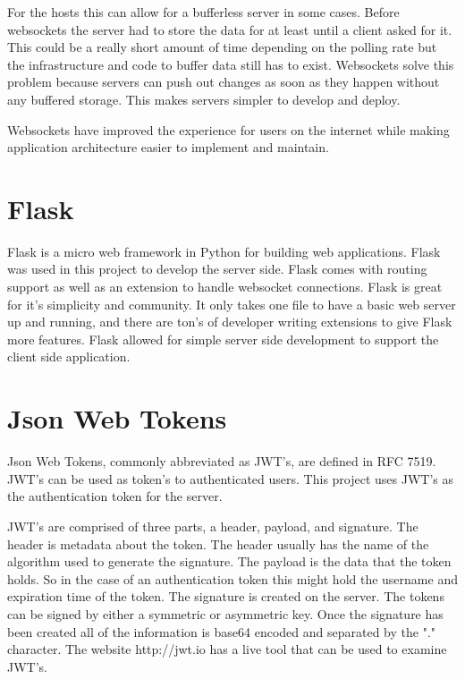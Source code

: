 For the hosts this can allow for a bufferless server in some cases. Before websockets the server had to store the data for at least until a client asked for it. This could be a really short amount of time depending on the polling rate but the infrastructure and code to buffer data still has to exist. Websockets solve this problem because servers can push out changes as soon as they happen without any buffered storage. This makes servers simpler to develop and deploy.


Websockets have improved the experience for users on the internet while making application architecture easier to implement and maintain.


\section{Flask}


Flask is a micro web framework in Python for building web applications.\cite{flask}
Flask was used in this project to develop the server side. Flask comes with routing support as well as an extension to handle websocket connections. Flask is great for it’s simplicity and community. It only takes one file to have a basic web server up and running, and there are ton’s of developer writing extensions to give Flask more features. Flask allowed for simple server side development to support the client side application.


\section{Json Web Tokens}


Json Web Tokens, commonly abbreviated as JWT’s, are defined in RFC 7519.\cite{jwt-rfc} JWT’s can be used as token’s to authenticated users. This project uses JWT’s as the authentication token for the server.


JWT’s are comprised of three parts, a header, payload, and signature. The header is metadata about the token. The header usually has the name of the algorithm used to generate the signature. The payload is the data that the token holds. So in the case of an authentication token this might hold the username and expiration time of the token. The signature is created on the server. The tokens can be signed by either a symmetric or asymmetric key. Once the signature has been created all of the information is base64 encoded and separated by the "." character. The website http://jwt.io has a live tool that can be used to examine JWT’s. 


